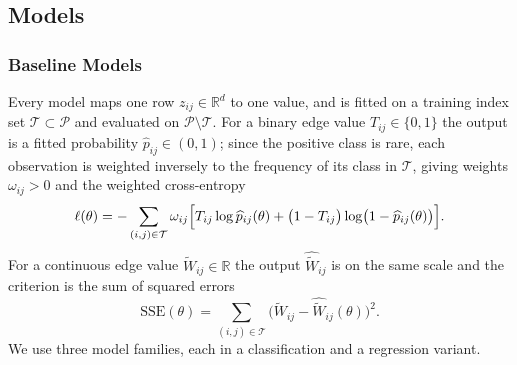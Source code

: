 \subsection{Models}
\label{sec:models}

\subsubsection{Baseline Models}

Every model maps one row \(z_{ij}\in\mathbb{R}^{d}\) to one value, and is fitted on a training index set
\(\mathcal{T}\subset\mathcal{P}\) and evaluated on \(\mathcal{P}\setminus\mathcal{T}\). For a binary edge value \(T_{ij}\in\{0,1\}\) the output is a fitted probability
\(\widehat p_{ij}\in(0,1)\); since the positive class is rare, each observation is weighted inversely to
the frequency of its class in \(\mathcal{T}\), giving weights \(\omega_{ij}>0\) and the weighted
cross-entropy
\begin{equation}\label{eq:bce}
 \ell(\theta)=-\sum_{(i,j)\in\mathcal{T}}\omega_{ij}
 \Bigl[T_{ij}\log\widehat p_{ij}(\theta)+\bigl(1-T_{ij}\bigr)\log\bigl(1-\widehat p_{ij}(\theta)\bigr)\Bigr].
\end{equation}
For a continuous edge value \(\widetilde W_{ij}\in\mathbb{R}\) the output \(\widehat{\widetilde W}_{ij}\) is
on the same scale and the criterion is the sum of squared errors
\begin{equation}\label{eq:sse}
 \mathrm{SSE}(\theta)=\sum_{(i,j)\in\mathcal{T}}
 \bigl(\widetilde W_{ij}-\widehat{\widetilde W}_{ij}(\theta)\bigr)^{2}.
\end{equation}
We use three model families, each in a classification and a regression variant.

